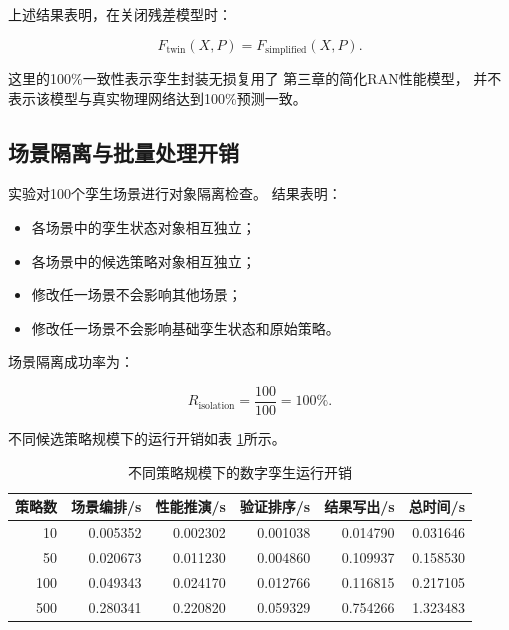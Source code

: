 \documentclass[lang=cn,12pt]{elegantbook}
\begin{document}
上述结果表明，在关闭残差模型时：

\begin{equation}
F_{\mathrm{twin}}(X,P)
=
F_{\mathrm{simplified}}(X,P).
\label{eq:twin_formal_parity_result}
\end{equation}

这里的100\%一致性表示孪生封装无损复用了
第三章的简化RAN性能模型，
并不表示该模型与真实物理网络达到100\%预测一致。


\subsection*{场景隔离与批量处理开销}

实验对100个孪生场景进行对象隔离检查。
结果表明：

\begin{itemize}
    \item 各场景中的孪生状态对象相互独立；
    \item 各场景中的候选策略对象相互独立；
    \item 修改任一场景不会影响其他场景；
    \item 修改任一场景不会影响基础孪生状态和原始策略。
\end{itemize}

场景隔离成功率为：

\begin{equation}
R_{\mathrm{isolation}}
=
\frac{100}{100}
=
100\%.
\end{equation}

不同候选策略规模下的运行开销如表
\ref{tab:twin_scalability_results}所示。

\begin{table}[htbp]
    \centering
    \caption{不同策略规模下的数字孪生运行开销}
    \label{tab:twin_scalability_results}
    \begin{tabular}{rrrrrr}
        \toprule
        策略数
        & 场景编排/s
        & 性能推演/s
        & 验证排序/s
        & 结果写出/s
        & 总时间/s \\
        \midrule
        10
        & 0.005352
        & 0.002302
        & 0.001038
        & 0.014790
        & 0.031646 \\
        50
        & 0.020673
        & 0.011230
        & 0.004860
        & 0.109937
        & 0.158530 \\
        100
        & 0.049343
        & 0.024170
        & 0.012766
        & 0.116815
        & 0.217105 \\
        500
        & 0.280341
        & 0.220820
        & 0.059329
        & 0.754266
        & 1.323483 \\
        \bottomrule
    \end{tabular}
\end{table}
\end{document}
